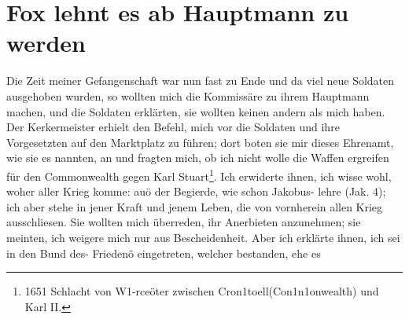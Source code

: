 \section{Fox lehnt es ab Hauptmann zu werden}

Die Zeit meiner Gefangenschaft war nun fast zu Ende und
da viel neue Soldaten ausgehoben wurden, so wollten mich die
Kommissäre zu ihrem Hauptmann machen, und die Soldaten
erklärten, sie wollten keinen andern als mich haben. Der 
Kerkermeister erhielt den Befehl, mich vor die Soldaten und ihre 
Vorgesetzten auf den Marktplatz zu führen; dort boten sie mir dieses
Ehrenamt, wie sie es nannten, an und fragten mich, ob ich nicht
wolle die Waffen ergreifen für den Commonwealth gegen Karl
Stuart\footnote{1651 Schlacht von W1-rceöter zwischen Cron1toell(Con1n1onwealth) und
Karl II.}. Ich erwiderte ihnen, ich wisse wohl, woher aller
Krieg komme: auö der Begierde, wie schon Jakobus- lehre
(Jak. 4); ich aber stehe in jener Kraft und jenem Leben,
die von vornherein allen Krieg ausschliesen. Sie wollten mich
überreden, ihr Anerbieten anzunehmen; sie meinten, ich weigere
mich nur aus Bescheidenheit. Aber ich erklärte ihnen, ich sei in
den Bund des- Friedenö eingetreten, welcher bestanden, ehe es



